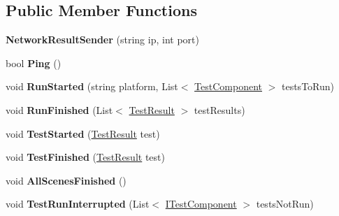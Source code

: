 \subsection*{Public Member Functions}
\begin{DoxyCompactItemize}
\item 
\mbox{\label{class_unity_test_1_1_network_result_sender_a40da48399de61c8039af45df7182de72}} 
{\bfseries Network\+Result\+Sender} (string ip, int port)
\item 
\mbox{\label{class_unity_test_1_1_network_result_sender_a4b7655dff471e842cf255792b295d015}} 
bool {\bfseries Ping} ()
\item 
\mbox{\label{class_unity_test_1_1_network_result_sender_a4f0df19d2e674c535f82c102b3f9f012}} 
void {\bfseries Run\+Started} (string platform, List$<$ \hyperlink{class_unity_test_1_1_test_component}{Test\+Component} $>$ tests\+To\+Run)
\item 
\mbox{\label{class_unity_test_1_1_network_result_sender_a5f284dd3df52cb36b7b50605bf62587e}} 
void {\bfseries Run\+Finished} (List$<$ \hyperlink{class_unity_test_1_1_test_result}{Test\+Result} $>$ test\+Results)
\item 
\mbox{\label{class_unity_test_1_1_network_result_sender_a0d90ced88f305b4dd0335e1017cf4d0a}} 
void {\bfseries Test\+Started} (\hyperlink{class_unity_test_1_1_test_result}{Test\+Result} test)
\item 
\mbox{\label{class_unity_test_1_1_network_result_sender_a5dd585414299cb1cc3652fe76d81c72d}} 
void {\bfseries Test\+Finished} (\hyperlink{class_unity_test_1_1_test_result}{Test\+Result} test)
\item 
\mbox{\label{class_unity_test_1_1_network_result_sender_a64d3f8143d7adbcc19c30b0c71a7b12a}} 
void {\bfseries All\+Scenes\+Finished} ()
\item 
\mbox{\label{class_unity_test_1_1_network_result_sender_a220318f863c91e8a933200cb9c51d86a}} 
void {\bfseries Test\+Run\+Interrupted} (List$<$ \hyperlink{interface_unity_test_1_1_i_test_component}{I\+Test\+Component} $>$ tests\+Not\+Run)
\end{DoxyCompactItemize}

